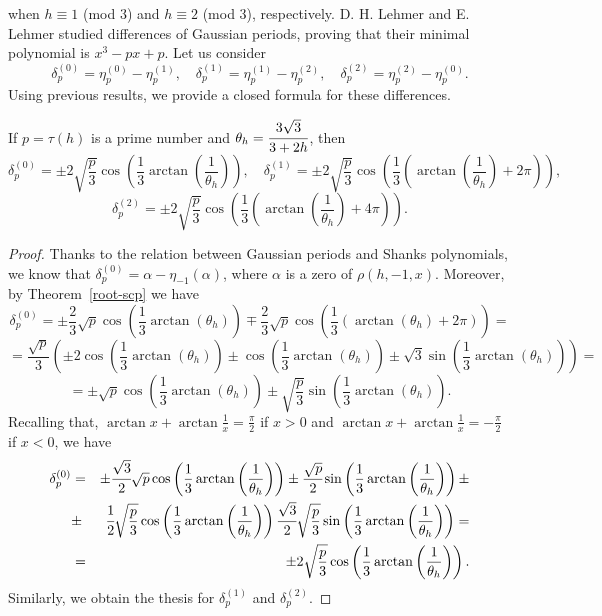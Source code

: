 \documentclass[12pt,reqno]{article}
\begin{document}
\normalsize
when $h\equiv 1$ (mod $3$) and $h\equiv 2$ (mod $3$), respectively.
D. H. Lehmer and E. Lehmer \cite{project} studied differences of Gaussian periods, proving that their minimal polynomial is $x^3-px+p$. Let us consider
$$\delta_p^{(0)}=\eta_p^{(0)}-\eta_p^{(1)},\quad \delta_p^{(1)}=\eta_p^{(1)}-\eta_p^{(2)}, \quad \delta_p^{(2)}=\eta_p^{(2)}-\eta_p^{(0)}.$$
Using previous results, we provide a closed formula for these differences.
\begin{proposition}
If $p=\tau(h)$ is a prime number and $\theta_h=\cfrac{3\sqrt{3}}{3+2h}$, then
$$\delta_p^{(0)}=\pm2\sqrt{\frac{p}{3}}\cos \left(\frac{1}{3}\arctan\left( \frac{1}{\theta_h}\right) \right), \quad \delta_p^{(1)}=\pm2\sqrt{\frac{p}{3}}\cos \left(\frac{1}{3}\left(\arctan \left(\frac{1}{\theta_h}\right)+2\pi\right) \right),$$
$$\delta_p^{(2)}=\pm2\sqrt{\frac{p}{3}}\cos \left(\frac{1}{3}\left(\arctan\left( \frac{1}{\theta_h}\right)+4\pi\right) \right).$$
\end{proposition}
\begin{proof}
Thanks to the relation between Gaussian periods and Shanks polynomials, we know that $\delta_p^{(0)}=\alpha-\eta_{-1}(\alpha)$, where $\alpha$ is a zero of $\rho(h,-1,x)$. Moreover, by Theorem~\ref{root-scp} we have
$$\delta_p^{(0)}= \pm \frac{2}{3}\sqrt{p}\cos\left(\frac{1}{3}\arctan (\theta_h)\right)\mp \frac{2}{3}\sqrt{p}\cos\left(\frac{1}{3}\left(\arctan (\theta_h)+2\pi\right)\right)=$$
$$=\frac{\sqrt{p}}{3}\left(\pm2\cos\left(\frac{1}{3}\arctan (\theta_h)\right)\pm\cos\left(\frac{1}{3}\arctan (\theta_h)\right)\pm\sqrt{3}\sin\left(\frac{1}{3}\arctan( \theta_h)\right)\right)=$$
$$=\pm\sqrt{p}\cos\left(\frac{1}{3}\arctan (\theta_h)\right)\pm\sqrt{\frac{p}{3}}\sin\left(\frac{1}{3}\arctan (\theta_h)\right).$$
Recalling that, $\arctan x+ \arctan\frac{1}{x}=\frac{\pi}{2}$ if $x>0$ and $\arctan x+ \arctan\frac{1}{x}=-\frac{\pi}{2}$ if $x<0$, we have
\begin{eqnarray*}\delta_p^{(0)}&=&  \pm\cfrac{\sqrt{3}}{2}\sqrt{p}\cos \left(\frac{1}{3}\arctan\left( \frac{1}{\theta_h}\right)\right)\pm\cfrac{\sqrt{p}}{2}\sin \left(\frac{1}{3}\arctan\left( \frac{1}{\theta_h}\right)\right)\pm\\
                               &\pm&\cfrac{1}{2}\sqrt{\frac{p}{3}}\cos \left(\frac{1}{3}\arctan\left( \frac{1}{\theta_h}\right)\right)
\cfrac{\sqrt{3}}{2}\sqrt{\frac{p}{3}}\sin \left(\frac{1}{3}\arctan \left(\frac{1}{\theta_h}\right)\right)=\\
                               &=&\pm2\sqrt{\frac{p}{3}}\cos\left(\frac{1}{3}\arctan\left( \frac{1}{\theta_h}\right)\right).\end{eqnarray*}
Similarly, we obtain the thesis for $\delta_p^{(1)}$ and $\delta_p^{(2)}$.
\end{proof}
\end{document}
